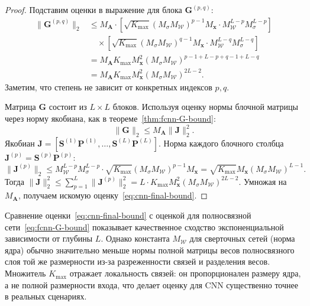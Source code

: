 \begin{proof}
Подставим оценки в выражение для блока $\mathbf{G}^{(p, q)}$:
\begin{align}
    \|\mathbf{G}^{(p, q)}\|_2 &\leqslant M_{\mathbf{A}} \cdot \left[ \sqrt{K_{\text{max}}} (M_{\sigma} M_{\mathcal{W}})^{p-1} M_{\mathbf{x}} \cdot M_{\mathcal{W}}^{L-p} M_{\sigma}^{L-p} \right] \\
    &\quad \times \left[ \sqrt{K_{\text{max}}} (M_{\sigma} M_{\mathcal{W}})^{q-1} M_{\mathbf{x}} \cdot M_{\mathcal{W}}^{L-q} M_{\sigma}^{L-q} \right] \\
    &= M_{\mathbf{A}} K_{\text{max}} M_{\mathbf{x}}^2 (M_{\sigma} M_{\mathcal{W}})^{p-1 + L-p + q-1 + L-q} \\
    &= M_{\mathbf{A}} K_{\text{max}} M_{\mathbf{x}}^2 (M_{\sigma} M_{\mathcal{W}})^{2L-2}.
\end{align}
Заметим, что степень не зависит от конкретных индексов $p, q$.

Матрица $\mathbf{G}$ состоит из $L \times L$ блоков. Используя оценку нормы блочной матрицы через норму якобиана, как в теореме~\ref{thm:fcnn-G-bound}:
\begin{equation}
    \|\mathbf{G}\|_2 \leqslant M_{\mathbf{A}} \|\mathbf{J}\|_2^2.
\end{equation}
Якобиан $\mathbf{J} = [\mathbf{S}^{(1)}\mathbf{P}^{(1)}, \dots, \mathbf{S}^{(L)}\mathbf{P}^{(L)}]$.
Норма каждого блочного столбца $\mathbf{J}^{(p)} = \mathbf{S}^{(p)}\mathbf{P}^{(p)}$:
\begin{equation}
    \|\mathbf{J}^{(p)}\|_2 \leqslant M_{\mathcal{W}}^{L-p} M_{\sigma}^{L-p} \cdot \sqrt{K_{\text{max}}} (M_{\sigma} M_{\mathcal{W}})^{p-1} M_{\mathbf{x}} = \sqrt{K_{\text{max}}} M_{\mathbf{x}} (M_{\sigma} M_{\mathcal{W}})^{L-1}.
\end{equation}
Тогда $\|\mathbf{J}\|_2^2 \leqslant \sum_{p=1}^L \|\mathbf{J}^{(p)}\|_2^2 = L \cdot K_{\text{max}} M_{\mathbf{x}}^2 (M_{\sigma} M_{\mathcal{W}})^{2L-2}$.
Умножая на $M_{\mathbf{A}}$, получаем искомую оценку~\eqref{eq:cnn-final-bound}.
\end{proof}

Сравнение оценки~\eqref{eq:cnn-final-bound} с оценкой для полносвязной сети~\eqref{eq:fcnn-G-bound} показывает качественное сходство экспоненциальной зависимости от глубины $L$. Однако константа $M_{\mathcal{W}}$ для сверточных сетей (норма ядра) обычно значительно меньше нормы полной матрицы весов полносвязного слоя той же размерности из-за разреженности связей и разделения весов. Множитель $K_{\max}$ отражает локальность связей: он пропорционален размеру ядра, а не полной размерности входа, что делает оценку для CNN существенно точнее в реальных сценариях.


